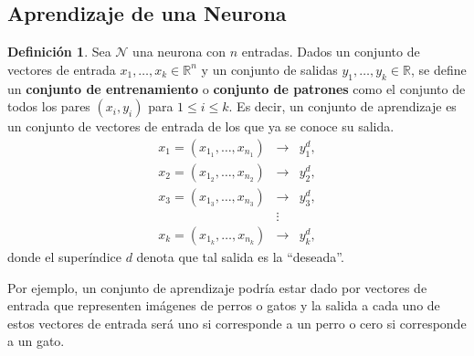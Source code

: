\documentclass[11pt,letterpaper]{article}
\theoremstyle{definition}
\newtheorem{defi}{Definición}[section]%
\theoremstyle{definition}
\theoremstyle{definition}
\theoremstyle{definition}
\theoremstyle{definition}
\theoremstyle{definition}
\theoremstyle{definition}
\theoremstyle{definition}
\begin{document}
\subsection{Aprendizaje de una Neurona}
\begin{defi}
	Sea $ \mathcal{N} $ una neurona con $ n $ entradas. Dados un conjunto de vectores de entrada  $x_1, \dots , x_k\in\mathbb{R}^n $ y un conjunto de salidas $ y_1, \dots, y_k\in\mathbb{R}$, se define un \textbf{conjunto de entrenamiento} o \textbf{conjunto de patrones} como el conjunto de todos los pares  $ (x_i, y_i) $ para $ 1\leq i \leq k $. Es decir, un conjunto de aprendizaje es un conjunto de vectores de entrada de los que ya se conoce su salida. 
	\begin{eqnarray*}
		x_1=(x_{1_1},\dots, x_{n_1} ) &\to& y_1^d,\\
		x_2=(x_{1_2},\dots, x_{n_2} ) &\to& y_2^d,\\
		x_3=(x_{1_3},\dots, x_{n_3} ) &\to& y_3^d,\\
		&\vdots& \\
		x_k=(x_{1_k},\dots, x_{n_k} ) &\to& y_k^d,
	\end{eqnarray*}
	donde el superíndice $ d $ denota que tal salida es la ``deseada''.
\end{defi}
Por ejemplo, un conjunto de aprendizaje podría estar dado por vectores de entrada que representen imágenes de perros o gatos y la salida a cada uno de estos vectores de entrada será  uno  si corresponde a un perro o cero si corresponde a un gato.
\begin{center}
\end{center}
\end{document}
